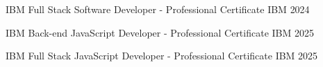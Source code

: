 

\begin{cvhonors}

  \cvhonor
    {IBM Full Stack Software Developer - Professional Certificate} %
    {IBM} %
    {} %
    {2024} %

  \cvhonor
    {IBM Back-end JavaScript Developer - Professional Certificate} %
    {IBM} %
    {} %
    {2025} %

  \cvhonor
    {IBM Full Stack JavaScript Developer - Professional Certificate} %
    {IBM} %
    {} %
    {2025} %

 

\end{cvhonors}

